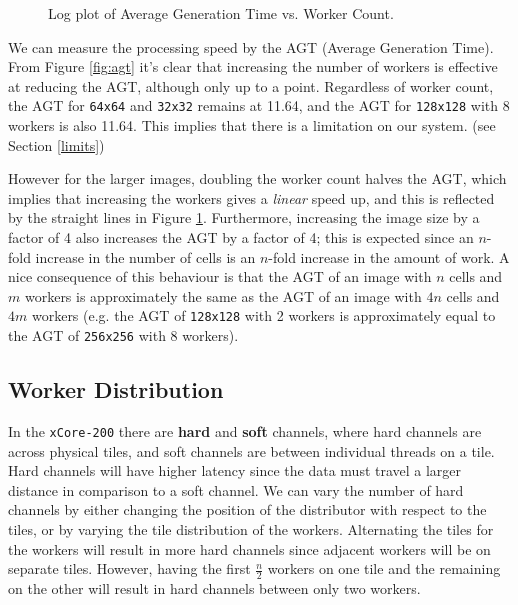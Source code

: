 \documentclass{article}
\begin{document}
    \begin{figure}[h]
        \begin{center}
            
            \caption{Log plot of Average Generation Time vs. Worker Count.}
            \label{fig:agtplot}
        \end{center}
    \end{figure}

    We can measure the processing speed by the AGT (Average Generation Time). From Figure \ref{fig:agt} it's clear that increasing the number of workers is effective at reducing the AGT, although only up to a point. Regardless of worker count, the AGT for \verb|64x64| and \verb|32x32| remains at 11.64, and the AGT for \verb|128x128| with 8 workers is also 11.64. This implies that there is a limitation on our system. (see Section \ref{limits})

    However for the larger images, doubling the worker count halves the AGT, which implies that increasing the workers gives a \textit{linear} speed up, and this is reflected by the straight lines in Figure \ref{fig:agtplot}. Furthermore, increasing the image size by a factor of 4 also increases the AGT by a factor of 4; this is expected since an $n$-fold increase in the number of cells is an $n$-fold increase in the amount of work. A nice consequence of this behaviour is that the AGT of an image with $n$ cells and $m$ workers is approximately the same as the AGT of an image with $4n$ cells and $4m$ workers (e.g. the AGT of \verb|128x128| with 2 workers is approximately equal to the AGT of \verb|256x256| with 8 workers).

    \subsection{Worker Distribution} 
    \label{workerdistribution}

    In the \verb|xCore-200| there are \textbf{hard} and \textbf{soft} channels, where hard channels are across physical tiles, and soft channels are between individual threads on a tile. Hard channels will have higher latency since the data must travel a larger distance in comparison to a soft channel. We can vary the number of hard channels by either changing the position of the distributor with respect to the tiles, or by varying the tile distribution of the workers. Alternating the tiles for the workers will result in more hard channels since adjacent workers will be on separate tiles. However, having the first $\frac{n}{2}$ workers on one tile and the remaining on the other will result in hard channels between only two workers.
\end{document}
